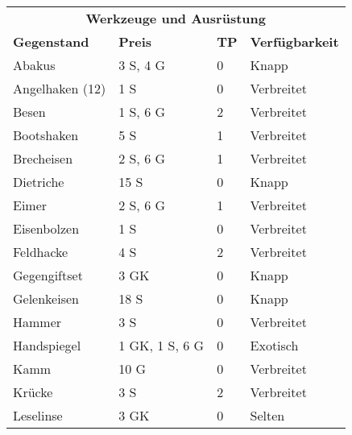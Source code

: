\documentclass[a4paper, 9pt]{scrreprt}
\begin{document}
\begin{table}[!ht]
    \renewcommand{\arraystretch}{1.2}
    \begin{tabular}{llll}
        \multicolumn{4}{c}{\cellcolor{gray!25}\textbf{Werkzeuge und Ausrüstung}}    \\
        \textbf{Gegenstand} & \textbf{Preis} & \textbf{TP} & \textbf{Verfügbarkeit} \\ \hline
        Abakus              & 3 S, 4 G       & 0           & Knapp                  \\ \hline
        Angelhaken (12)     & 1 S            & 0           & Verbreitet             \\ \hline
        Besen               & 1 S, 6 G       & 2           & Verbreitet             \\ \hline
        Bootshaken          & 5 S            & 1           & Verbreitet             \\ \hline
        Brecheisen          & 2 S, 6 G       & 1           & Verbreitet             \\ \hline
        Dietriche           & 15 S           & 0           & Knapp                  \\ \hline
        Eimer               & 2 S, 6 G       & 1           & Verbreitet             \\ \hline
        Eisenbolzen         & 1 S            & 0           & Verbreitet             \\ \hline
        Feldhacke           & 4 S            & 2           & Verbreitet             \\ \hline
        Gegengiftset        & 3 GK           & 0           & Knapp                  \\ \hline
        Gelenkeisen         & 18 S           & 0           & Knapp                  \\ \hline
        Hammer              & 3 S            & 0           & Verbreitet             \\ \hline
        Handspiegel         & 1 GK, 1 S, 6 G & 0           & Exotisch               \\ \hline
        Kamm                & 10 G           & 0           & Verbreitet             \\ \hline
        Krücke              & 3 S            & 2           & Verbreitet             \\ \hline
        Leselinse           & 3 GK           & 0           & Selten                 \\ \hline

\end{tabular}
\end{table}
\end{document}
